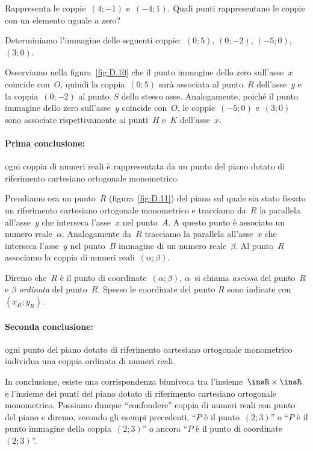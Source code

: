 \begin{exrig}
 \begin{esempio}
 \label{ex:D.12}
Rappresenta le coppie~$(4;-1)$ e~$(-4;1)$.
Quali punti rappresentano le coppie con un elemento uguale a zero?
 \end{esempio}

 \begin{esempio}
 \label{ex:D.13}
Determiniamo l'immagine delle seguenti coppie:~$(0;5)$, $(0;-2)$, $(-5;0)$, $(3;0)$.

Osserviamo nella figura~\ref{fig:D.10} che il punto immagine dello zero sull'asse~$x$ coincide con~$O$, quindi la coppia~$(0;5)$ sarà associata al punto~$R$
dell'asse~$y$ e la coppia~$(0;-2)$ al punto~$S$ dello stesso asse. Analogamente, poiché il punto immagine dello zero sull'asse~$y$
coincide con~$O$, le coppie~$(-5;0)$ e~$(3;0)$ sono associate rispettivamente ai punti~$H$ e~$K$ dell'asse~$x$.
 \end{esempio}
\end{exrig}

\paragraph{Prima conclusione:} ogni coppia di numeri reali è rappresentata da un punto del piano dotato di riferimento cartesiano ortogonale
monometrico.

Prendiamo ora un punto~$R$ (figura~\ref{fig:D.11}) del piano sul quale sia stato fissato un riferimento cartesiano ortogonale monometrico e tracciamo da~$R$
la parallela all'asse~$y$ che interseca l'asse~$x$ nel punto~$A$. A questo punto è associato un numero reale~$\alpha$.
Analogamente da~$R$ tracciamo la parallela all'asse~$x$ che interseca l'asse~$y$ nel punto~$B$ immagine di un numero reale~$\beta$.
Al punto~$R$ associamo la coppia di numeri reali~$(\alpha; \beta)$.

Diremo che~$R$ è il punto di coordinate~$(\alpha;\beta )$, $\alpha~$ si chiama \emph{ascissa} del punto~$R$ e $\beta$ \emph{ordinata}
del punto~$R$. Spesso le coordinate del punto $R$ sono indicate con $(x_R;y_R)$.

\paragraph{Seconda conclusione:} ogni punto del piano dotato di riferimento cartesiano ortogonale monometrico individua una coppia ordinata
di numeri reali.

In conclusione, esiste una corrispondenza biunivoca tra l'insieme~$\insR\times \insR$ e l'insieme dei punti del piano dotato di
riferimento cartesiano ortogonale monometrico. Possiamo dunque ``confondere'' coppia di numeri reali con punto del piano e
diremo, secondo gli esempi precedenti, ``$P$ è il punto~$(2;3)$'' o ``$P$
è il punto immagine della coppia~$(2;3)$'' o ancora ``$P$ è il punto di coordinate~$(2;3)$''.

